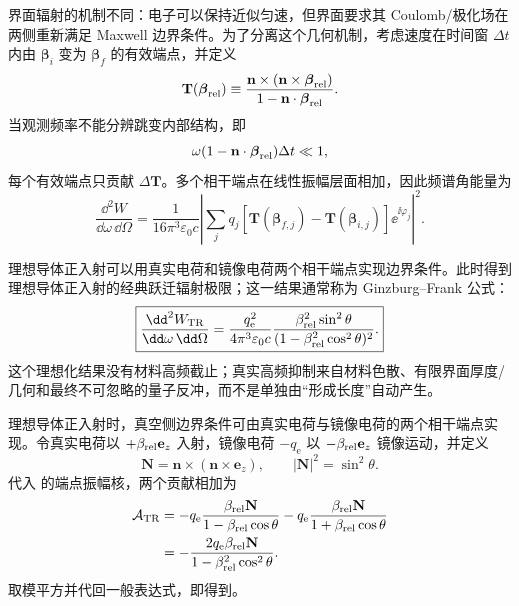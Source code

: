 界面辐射的机制不同：电子可以保持近似匀速，但界面要求其 Coulomb/极化场在两侧重新满足 Maxwell 边界条件。为了分离这个几何机制，考虑速度在时间窗 $\Delta t$ 内由 $\boldsymbol\beta_i$ 变为 $\boldsymbol\beta_f$ 的有效端点，并定义
\begin{equation*}
\mathbf T(\boldsymbol\beta_{\rm rel})
\equiv
\frac{\mathbf n\times(\mathbf n\times\boldsymbol\beta_{\rm rel})}
{1-\mathbf n\cdot\boldsymbol\beta_{\rm rel}}.
\end{equation*}
当观测频率不能分辨跳变内部结构，即
\begin{equation*}
\omega(1-\mathbf n\cdot\boldsymbol\beta_{\rm rel})\Delta t\ll1,
\end{equation*}
每个有效端点只贡献 $\Delta\mathbf T$。多个相干端点在线性振幅层面相加，因此频谱角能量为
\begin{equation}
\boxed{
\frac{\dd^2 W}{\dd\omega\,\dd\Omega}
=\frac{1}{16\pi^3\varepsilon_0c}
\left|
\sum_jq_j
[\mathbf T(\boldsymbol\beta_{f,j})-\mathbf T(\boldsymbol\beta_{i,j})]
\ee^{\ii\varphi_j}
\right|^2.}
\label{eq:abrupt_velocity_change_spectrum}
\end{equation}
\begin{exbox}[理想导体渡越辐射]
理想导体正入射可以用真实电荷和镜像电荷两个相干端点实现边界条件。此时得到理想导体正入射的经典跃迁辐射极限；这一结果通常称为 Ginzburg--Frank 公式：
\begin{equation}
\boxed{
\frac{\dd^2 W_{\rm TR}}{\dd\omega\,\dd\Omega}
=\frac{q_{\mathrm e}^2}{4\pi^3\varepsilon_0c}
\frac{\beta_{\rm rel}^2\sin^2\theta}
{(1-\beta_{\rm rel}^2\cos^2\theta)^2}.}
\label{eq:ginzburg_frank_perfect_conductor}
\end{equation}
这个理想化结果没有材料高频截止；真实高频抑制来自材料色散、有限界面厚度/几何和最终不可忽略的量子反冲，而不是单独由“形成长度”自动产生。

\medskip

理想导体正入射时，真空侧边界条件可由真实电荷与镜像电荷的两个相干端点实现。令真实电荷以 $+\beta_{\rm rel}\mathbf e_z$ 入射，镜像电荷 $-q_{\mathrm e}$ 以 $-\beta_{\rm rel}\mathbf e_z$ 镜像运动，并定义
\begin{equation*}
\mathbf N=\mathbf n\times(\mathbf n\times\mathbf e_z),
\qquad |\mathbf N|^2=\sin^2\theta.
\end{equation*}
代入 的端点振幅核，两个贡献相加为
\begin{align*}
\mathcal A_{\rm TR}
&=-q_{\mathrm e}\frac{\beta_{\rm rel}\mathbf N}{1-\beta_{\rm rel}\cos\theta}
-q_{\mathrm e}\frac{\beta_{\rm rel}\mathbf N}{1+\beta_{\rm rel}\cos\theta}\\
&=-\frac{2q_{\mathrm e}\beta_{\rm rel}\mathbf N}{1-\beta_{\rm rel}^2\cos^2\theta}.
\end{align*}
取模平方并代回一般表达式，即得到。
\end{exbox}

